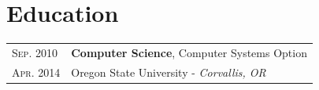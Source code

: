 \documentclass[10pt]{article}
\newenvironment{sectiontable}{ \begin{tabular}{p{16mm}|p{16cm}} }{ \end{tabular} }
\begin{document}

\section{Education}

\begin{sectiontable}

{\small\textsc{Sep. 2010}} & \textbf{Computer Science}, Computer Systems Option\\ 
{\small\textsc{Apr. 2014}}	& Oregon State University - \emph{\small Corvallis, OR}\\

\end{sectiontable}
\end{document}
